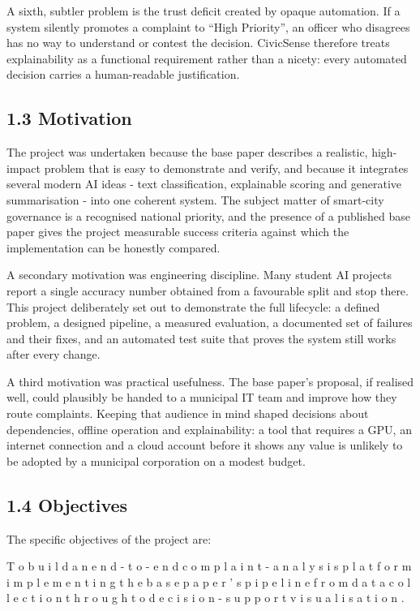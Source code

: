 \documentclass[10pt,letterpaper,oneside]{article}\usepackage{geometry}\geometry{top=1in,bottom=1in,left=1in,right=1in,includeheadfoot}\usepackage{xcolor}\definecolor{color@navy}{HTML}{1F3B63}\definecolor{color@grey}{HTML}{404040}\definecolor{color@hdr}{HTML}{F2F4F7}\usepackage{titlesec}\titleformat{\section}  {\normalfont\huge\bfseries\color@navy}  {}{0pt}{\MakeUppercase}\titleformat{\subsection}  {\normalfont\Large\bfseries\color@navy}  {}{0pt}{}\titleformat{\subsubsection}  {\normalfont\large\bfseries\color@navy}  {}{0pt}{}\titlespacing*{\section}{0pt}{14pt}{6pt}\titlespacing*{\subsection}{0pt}{10pt}{4pt}\titlespacing*{\subsubsection}{0pt}{8pt}{3pt}\setlength{\parindent}{0pt}\setlength{\parskip}{0.6em}\parindent=0pt\usepackage{enumitem}\setlist{nosep,leftmargin=*,itemsep=0pt,topsep=2pt,partopsep=0pt}\usepackage{array}\usepackage{booktabs}\usepackage{caption}\captionsetup{font={small,it},labelfont={bf},labelsep=period,  parskip=2pt,skip=4pt,list=no}\captionsetup[table]{labelfont={bf,small,color@navy},name=Table}\usepackage{graphicx}\usepackage{verbatim}\usepackage{ragged2e}\usepackage{longtable}\usepackage{tabularx}\usepackage{multirow}\usepackage{colortbl}\definecolor{rowshade}{HTML}{F2F4F7}\usepackage{tikz}\usetikzlibrary{positioning,calc}\usepackage[hidelinks]{hyperref}\hypersetup{colorlinks=true,linkcolor=color@navy,urlcolor=color@navy}\pagestyle{fancy}\fancyhf{}\renewcommand{\headrulewidth}{0.4pt}\fancyhead[L]{\small\color@navy CivicSense — Project Report}\fancyhead[R]{\small\color@grey October 11, 2026}\fancyfoot[C]{\small\color@grey An Integrated Intelligent Triage Pipelin}\fancyfoot[R]{\small\color@grey Page \thepage}\usepackage{setspace}\setstretch{1.15}\AtBeginDocument{  \hypersetup{pdftitle={An Integrated Intelligent Triage Pipeline for AI-Enhanced Citizen Complaint Management},    pdfauthor={CivicSense Project Team},    pdfsubject={Project Report},    pdfkeywords={smart cities, NLP, complaint management, e-governance},    pdfcreator={CivicSense Project Team}  }}
\begin{document}
A sixth, subtler problem is the trust deficit created by opaque automation. If a system silently promotes a complaint to “High Priority”, an officer who disagrees has no way to understand or contest the decision. CivicSense therefore treats explainability as a functional requirement rather than a nicety: every automated decision carries a human-readable justification.

\subsection*{1.3 Motivation}
The project was undertaken because the base paper describes a realistic, high-impact problem that is easy to demonstrate and verify, and because it integrates several modern AI ideas - text classification, explainable scoring and generative summarisation - into one coherent system. The subject matter of smart-city governance is a recognised national priority, and the presence of a published base paper gives the project measurable success criteria against which the implementation can be honestly compared.

A secondary motivation was engineering discipline. Many student AI projects report a single accuracy number obtained from a favourable split and stop there. This project deliberately set out to demonstrate the full lifecycle: a defined problem, a designed pipeline, a measured evaluation, a documented set of failures and their fixes, and an automated test suite that proves the system still works after every change.

A third motivation was practical usefulness. The base paper’s proposal, if realised well, could plausibly be handed to a municipal IT team and improve how they route complaints. Keeping that audience in mind shaped decisions about dependencies, offline operation and explainability: a tool that requires a GPU, an internet connection and a cloud account before it shows any value is unlikely to be adopted by a municipal corporation on a modest budget.

\subsection*{1.4 Objectives}
The specific objectives of the project are:

\item T o   b u i l d   a n   e n d - t o - e n d   c o m p l a i n t - a n a l y s i s   p l a t f o r m   i m p l e m e n t i n g   t h e   b a s e   p a p e r ’ s   p i p e l i n e   f r o m   d a t a   c o l l e c t i o n   t h r o u g h   t o   d e c i s i o n - s u p p o r t   v i s u a l i s a t i o n .
\end{document}
